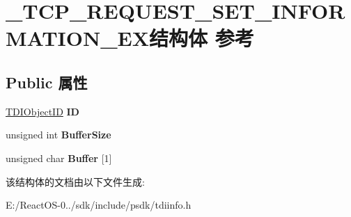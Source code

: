 \hypertarget{struct___t_c_p___r_e_q_u_e_s_t___s_e_t___i_n_f_o_r_m_a_t_i_o_n___e_x}{}\section{\+\_\+\+T\+C\+P\+\_\+\+R\+E\+Q\+U\+E\+S\+T\+\_\+\+S\+E\+T\+\_\+\+I\+N\+F\+O\+R\+M\+A\+T\+I\+O\+N\+\_\+\+E\+X结构体 参考}
\label{struct___t_c_p___r_e_q_u_e_s_t___s_e_t___i_n_f_o_r_m_a_t_i_o_n___e_x}
\subsection*{Public 属性}
\begin{DoxyCompactItemize}
\item 
\mbox{\label{struct___t_c_p___r_e_q_u_e_s_t___s_e_t___i_n_f_o_r_m_a_t_i_o_n___e_x_aa5d78e4480ca75a9e893d1bd1448ad5a}} 
\hyperlink{struct___t_d_i_object_i_d}{T\+D\+I\+Object\+ID} {\bfseries ID}
\item 
\mbox{\label{struct___t_c_p___r_e_q_u_e_s_t___s_e_t___i_n_f_o_r_m_a_t_i_o_n___e_x_a3e1c79ee931503a5ea447c952c2c00f9}} 
unsigned int {\bfseries Buffer\+Size}
\item 
\mbox{\label{struct___t_c_p___r_e_q_u_e_s_t___s_e_t___i_n_f_o_r_m_a_t_i_o_n___e_x_ad3e77db821b55a0a5738ca672a6fb822}} 
unsigned char {\bfseries Buffer} \mbox{[}1\mbox{]}
\end{DoxyCompactItemize}


该结构体的文档由以下文件生成\+:\begin{DoxyCompactItemize}
\item 
E\+:/\+React\+O\+S-\/0../sdk/include/psdk/tdiinfo.\+h\end{DoxyCompactItemize}
